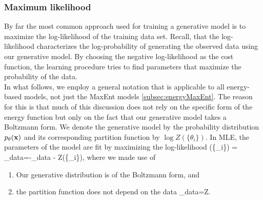 \subsubsection{Maximum likelihood}
By far the most common approach used for training a generative model is to maximize the log-likelihood of the training data set. Recall, that the log-likelihood characterizes the log-probability of generating the observed data using our generative model. By choosing the negative log-likelihood as the cost function, the learning procedure tries to find parameters that maximize the probability of the data.\\
In what follows, we employ a general notation that is applicable to all energy-based models, not just the MaxEnt models \ref{subsec:energyMaxEnt}. The reason for this is that much of this discussion does not rely on the specific form of the energy function but only on the fact that our generative model takes a Boltzmann form. We denote the generative model by the probability distribution $p_{\theta}(\mathbf{x})$ and its corresponding partition function by $\log Z(\{\theta_i\})$. In MLE, the parameters of the model are fit by maximizing the log-likelihood
\be 
\label{eq:energyCostfctLogLikely}
\mL(\{\theta_i\}) = _{data}=-_{data} - \log Z(\{\theta_i\}),
\ee 
where we made use of 
\begin{enumerate}
	\item Our generative distribution is of the Boltzmann form, and
	\item the partition function does not depend on the data
	\bse 
	_{data}=Z.
	\ese 
\end{enumerate}


